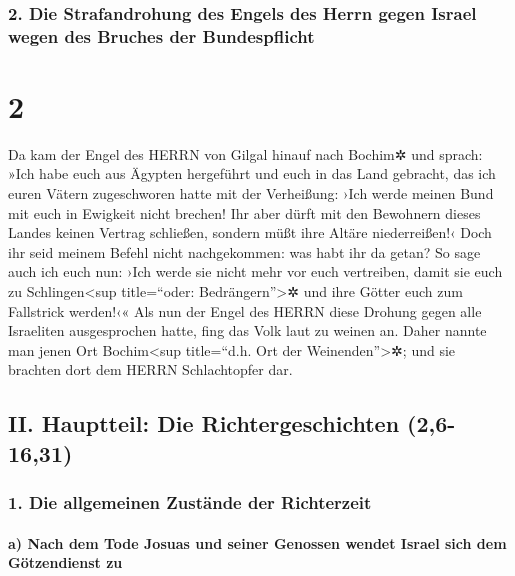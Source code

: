 \hypertarget{die-strafandrohung-des-engels-des-herrn-gegen-israel-wegen-des-bruches-der-bundespflicht}{%
\subsubsection{2. Die Strafandrohung des Engels des Herrn gegen Israel
wegen des Bruches der
Bundespflicht}\label{die-strafandrohung-des-engels-des-herrn-gegen-israel-wegen-des-bruches-der-bundespflicht}}

\hypertarget{section-1}{%
\section{2}\label{section-1}}

Da kam der Engel des HERRN von Gilgal hinauf nach Bochim✲
und sprach: »Ich habe euch aus Ägypten hergeführt und euch in das Land
gebracht, das ich euren Vätern zugeschworen hatte mit der Verheißung:
›Ich werde meinen Bund mit euch in Ewigkeit nicht brechen!
Ihr aber dürft mit den Bewohnern dieses Landes keinen
Vertrag schließen, sondern müßt ihre Altäre niederreißen!‹ Doch ihr seid
meinem Befehl nicht nachgekommen: was habt ihr da getan?
So sage auch ich euch nun: ›Ich werde sie nicht mehr vor
euch vertreiben, damit sie euch zu Schlingen\textless sup title=``oder:
Bedrängern''\textgreater✲ und ihre Götter euch zum Fallstrick werden!‹«
Als nun der Engel des HERRN diese Drohung gegen alle
Israeliten ausgesprochen hatte, fing das Volk laut zu weinen an.
Daher nannte man jenen Ort Bochim\textless sup
title=``d.h. Ort der Weinenden''\textgreater✲; und sie brachten dort dem
HERRN Schlachtopfer dar.

\hypertarget{ii.-hauptteil-die-richtergeschichten-26-1631}{%
\subsection{II. Hauptteil: Die Richtergeschichten
(2,6-16,31)}\label{ii.-hauptteil-die-richtergeschichten-26-1631}}

\hypertarget{die-allgemeinen-zustuxe4nde-der-richterzeit}{%
\subsubsection{1. Die allgemeinen Zustände der
Richterzeit}\label{die-allgemeinen-zustuxe4nde-der-richterzeit}}

\hypertarget{a-nach-dem-tode-josuas-und-seiner-genossen-wendet-israel-sich-dem-guxf6tzendienst-zu}{%
\paragraph{a) Nach dem Tode Josuas und seiner Genossen wendet Israel
sich dem Götzendienst
zu}\label{a-nach-dem-tode-josuas-und-seiner-genossen-wendet-israel-sich-dem-guxf6tzendienst-zu}}

